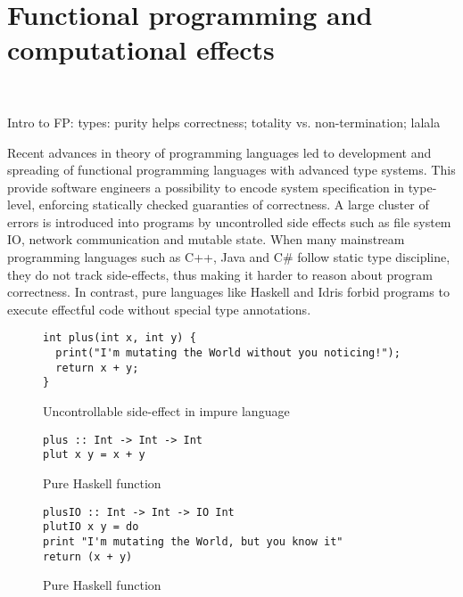 \chapter{Functional programming and computational effects}
~\label{cpt-effects}

Intro to FP: types: purity helps correctness; totality vs. non-termination; lalala

Recent advances in theory of programming languages led to development and spreading
of functional programming languages with advanced type systems. This provide
software engineers a possibility to encode system specification in type-level, enforcing
statically checked guaranties of correctness. A large cluster of errors is
introduced into programs by uncontrolled side effects such as file system IO,
network communication and mutable state. When many mainstream programming languages such as C++,
Java and C\# follow static type discipline, they do not track
side-effects, thus making it harder to reason about program correctness. In contrast,
pure languages like Haskell and Idris forbid programs to execute effectful code
without special type annotations.

\begin{figure}[h]
\begin {lstlisting}
int plus(int x, int y) {
  print("I'm mutating the World without you noticing!");
  return x + y;
}
\end{lstlisting}
\caption{Uncontrollable side-effect in impure language}
\label{listing:effectfulPlus}
\end{figure}

\begin{figure}[h]
\begin{lstlisting}
plus :: Int -> Int -> Int
plut x y = x + y
\end{lstlisting}
\caption{Pure Haskell function}
\label{listing:purePlusHaskell}
\end{figure}

\begin{figure}[h]
\begin{lstlisting}
plusIO :: Int -> Int -> IO Int
plutIO x y = do
print "I'm mutating the World, but you know it"
return (x + y)
\end{lstlisting}
\caption{Pure Haskell function}
\label{listing:purePlusHaskell}
\end{figure}

